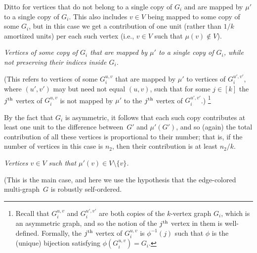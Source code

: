 \documentclass[10pt,a4paper]{article}
\theoremstyle{definition}
\newcommand{\xth}{{\rm th}}
\begin{document}
Ditto for vertices that do not belong to a single copy of $G_i$
and are mapped by $\mu'$ to a single copy of $G_i$.
This also includes $v\in V$ being mapped to some copy of some $G_i$,
but in this case we get a contribution of one unit
(rather than $1/k$ amortized units)
per each such vertex (i.e., $v\in V$ such that $\mu(v)\not\in V$).
%
%
%
%
%
%
%
\item[{\em Case 2}:] {\em Vertices of some copy of $G_i$
that are mapped by $\mu'$ to a single copy of $G_i$,
while not preserving their indices inside $G_i$.}

(This refers to vertices of some $G_i^{u,v}$
that are mapped by $\mu'$ to vertices of $G_i^{u',v'}$,
where $(u',v')$ may but need not equal $(u,v)$,
such that for some $j\in[k]$ the $j^\xth$ vertex of $G_i^{u,v}$
is not mapped by $\mu'$ to the $j^\xth$ vertex of $G_i^{u',v'}$.)
\footnote{Recall that $G_i^{u,v}$ and $G_i^{u',v'}$ are both
copies of the $k$-vertex graph $G_i$, which is an asymmetric graph,
and so the notion of the $j^\xth$ vertex in them is well-defined.
Formally, the $j^\xth$ vertex of $G_i^{u,v}$ is $\phi^{-1}(j)$ such
that $\phi$ is the (unique) bijection satisfying $\phi(G_i^{u,v})=G_i$.}

By the fact that $G_i$ is asymmetric,
it follows that each such copy contributes at least one unit
to the difference between~$G'$ and $\mu'(G')$,
and so (again) the total contribution of all these vertices
is proportional to their number; that is,
if the number of vertices in this case is $n_2$,
then their contribution is at least $n_2/k$.

%
%
\item[{\em Case 3}:]
{\em Vertices $v\in V$ such that $\mu'(v)\in V\setminus\{v\}$.}

(This is the main case, and here we use the hypothesis that
the edge-colored multi-graph~$G$ is robustly self-ordered.
\end{document}
